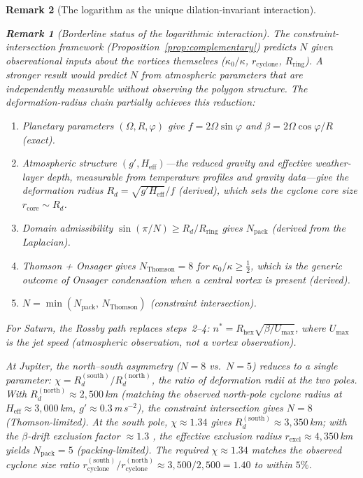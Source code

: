 \documentclass[12pt, a4paper]{article}
\newtheorem{remark}{Remark}[section]
\numberwithin{equation}{section}
\begin{document}
\begin{remark}[The logarithm as the unique dilation-invariant interaction]
\begin{remark}[Borderline status of the logarithmic interaction]
The constraint-intersection framework
(Proposition~\ref{prop:complementary}) predicts $N$ given
observational inputs about the vortices themselves ($\kappa_0/\kappa$,
$r_{\mathrm{cyclone}}$, $R_{\mathrm{ring}}$).  A stronger result
would predict $N$ from \emph{atmospheric} parameters that are
independently measurable without observing the polygon structure.
The deformation-radius chain partially achieves this reduction:
\begin{enumerate}
  \item \emph{Planetary parameters} $(\Omega, R, \varphi)$ give
    $f = 2\Omega\sin\varphi$ and
    $\beta = 2\Omega\cos\varphi / R$ (exact).
  \item \emph{Atmospheric structure} $(g', H_{\mathrm{eff}})$---the
    reduced gravity and effective weather-layer depth, measurable from
    temperature profiles and gravity data---give the deformation
    radius $R_d = \sqrt{g' H_{\mathrm{eff}}}/f$ (derived), which
    sets the cyclone core size $r_{\mathrm{core}} \sim R_d$.
  \item \emph{Domain admissibility}
    $\sin(\pi/N) \ge R_d / R_{\mathrm{ring}}$ gives
    $N_{\mathrm{pack}}$ (derived from the Laplacian).
  \item \emph{Thomson + Onsager} gives $N_{\mathrm{Thomson}} = 8$
    for $\kappa_0/\kappa \ge \tfrac{1}{2}$, which is the
    generic outcome of Onsager condensation when a central vortex
    is present (derived).
  \item $N = \min(N_{\mathrm{pack}},\, N_{\mathrm{Thomson}})$
    (constraint intersection).
\end{enumerate}
For Saturn, the Rossby path replaces steps~2--4:
$n^* = R_{\mathrm{hex}}\sqrt{\beta/U_{\max}}$, where
$U_{\max}$ is the jet speed (atmospheric observation, not a
vortex observation).

At Jupiter, the north--south asymmetry ($N = 8$ vs.\ $N = 5$) reduces
to a single parameter: $\chi = R_d^{(\mathrm{south})}/R_d^{(\mathrm{north})}$,
the ratio of deformation radii at the two poles.  With
$R_d^{(\mathrm{north})} \approx 2{,}500$\,km (matching the observed
north-pole cyclone radius at $H_{\mathrm{eff}} \approx 3{,}000$\,km,
$g' \approx 0.3$\,m\,s$^{-2}$), the constraint intersection gives
$N = 8$ (Thomson-limited).  At the south pole,
$\chi \approx 1.34$ gives $R_d^{(\mathrm{south})} \approx 3{,}350$\,km;
with the $\beta$-drift exclusion factor $\approx 1.3$
\citep{Gavriel2021}, the effective exclusion radius
$r_{\mathrm{excl}} \approx 4{,}350$\,km yields
$N_{\mathrm{pack}} = 5$ (packing-limited).  The required
$\chi \approx 1.34$ matches the observed cyclone size ratio
$r_{\mathrm{cyclone}}^{(\mathrm{south})}/r_{\mathrm{cyclone}}^{(\mathrm{north})}
\approx 3{,}500/2{,}500 = 1.40$ to within $5\%$.


\end{remark}
\end{remark}
\end{document}
